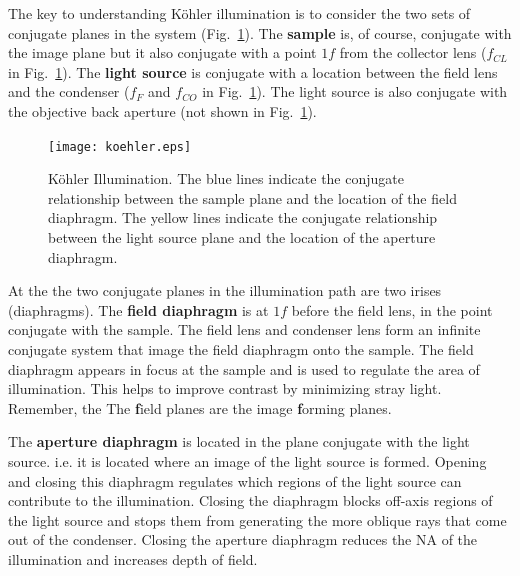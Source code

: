 \documentclass[a4paper]{report}
\begin{document}
The key to understanding K\"{o}hler illumination is to consider the two sets of conjugate planes in the system (Fig.~\ref{fig:koehler}). 
The \textbf{sample} is, of course, conjugate with the image plane but it also conjugate with a point $1f$ from the collector lens ($f_{CL}$ in Fig.~\ref{fig:koehler}). 
The \textbf{light source} is conjugate with a location between the field lens and the condenser ($f_F$ and $f_{CO}$ in Fig.~\ref{fig:koehler}). 
The light source is also conjugate with the objective back aperture (not shown in Fig.~\ref{fig:koehler}). 

\begin{figure}[ht]
\center
\texttt{[image: koehler.eps]}
\caption{K\"{o}hler Illumination. 
The blue lines indicate the conjugate relationship between the sample plane and the location of the field diaphragm.
The yellow lines indicate the conjugate relationship between the light source plane and the location of the aperture diaphragm.
}
\label{fig:koehler}
\end{figure}

At the the two conjugate planes in the illumination path are two irises (diaphragms). 
The \textbf{field diaphragm} is at $1f$ before the field lens, in the point conjugate with the sample. 
The field lens and condenser lens form an infinite conjugate system that image the field diaphragm onto the sample. 
The field diaphragm appears in focus at the sample and is used to regulate the area of illumination. 
This helps to improve contrast by minimizing stray light. 
Remember, the The \textbf{f}ield planes are the image \textbf{f}orming planes. 

The \textbf{aperture diaphragm} is located in the plane conjugate with the light source. 
i.e. it is located where an image of the light source is formed. 
Opening and closing this diaphragm regulates which regions of the light source can contribute to the illumination. 
Closing the diaphragm blocks off-axis regions of the light source and stops them from generating the more oblique rays that come out of the condenser. 
Closing the aperture diaphragm reduces the NA of the illumination and increases depth of field. 
\end{document}
